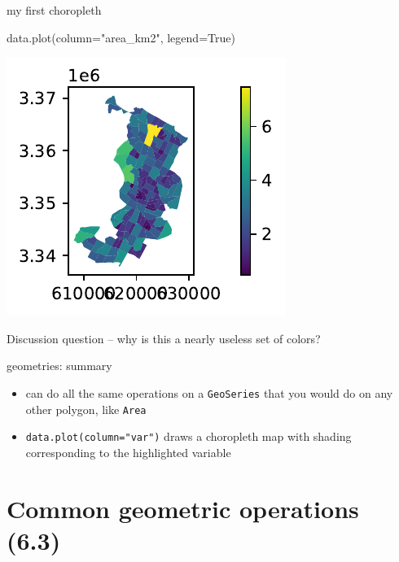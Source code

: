 \documentclass[
  ignorenonframetext,
]{beamer}
\newenvironment{Shaded}{\begin{snugshade}}{\end{snugshade}}
\newcommand{\NormalTok}[1]{\textcolor[rgb]{0.00,0.23,0.31}{#1}}
\newcommand{\OperatorTok}[1]{\textcolor[rgb]{0.37,0.37,0.37}{#1}}
\newcommand{\StringTok}[1]{\textcolor[rgb]{0.13,0.47,0.30}{#1}}
\newcommand{\VariableTok}[1]{\textcolor[rgb]{0.07,0.07,0.07}{#1}}
\providecommand{\tightlist}{%
  \setlength{\itemsep}{0pt}\setlength{\parskip}{0pt}}\usepackage{longtable,booktabs,array}
\begin{document}
\begin{frame}[fragile]{my first choropleth}
\label{my-first-choropleth}
\begin{Shaded}
\begin{Highlighting}[]
\NormalTok{data.plot(column}\OperatorTok{=}\StringTok{"area\_km2"}\NormalTok{, legend}\OperatorTok{=}\VariableTok{True}\NormalTok{)}
\end{Highlighting}
\end{Shaded}

\includegraphics{spatial_2_files/figure-beamer/cell-11-output-1.pdf}

Discussion question -- why is this a nearly useless set of colors?
\end{frame}

\begin{frame}[fragile]{geometries: summary}
\label{geometries-summary}
\begin{itemize}
\tightlist
\item
  can do all the same operations on a \texttt{GeoSeries} that you would
  do on any other polygon, like \texttt{Area}
\item
  \texttt{data.plot(column="var")} draws a choropleth map with shading
  corresponding to the highlighted variable
\end{itemize}
\end{frame}

\section{Common geometric operations
(6.3)}\label{common-geometric-operations-6.3}
\end{document}
